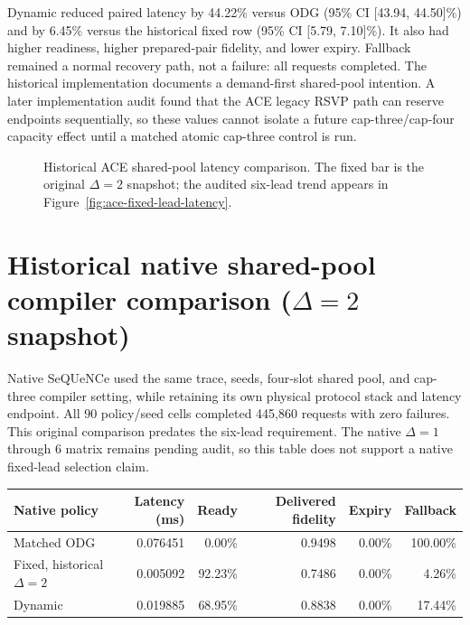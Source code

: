\documentclass[11pt,a4paper]{report}
\begin{document}
Dynamic reduced paired latency by 44.22\% versus ODG (95\% CI
[43.94, 44.50]\%) and by 6.45\% versus the historical fixed row (95\% CI
[5.79, 7.10]\%). It also had higher readiness, higher prepared-pair fidelity,
and lower expiry. Fallback remained a normal recovery path, not a failure: all
requests completed. The historical implementation documents a demand-first
shared-pool intention. A later implementation audit found that the ACE legacy
RSVP path can reserve endpoints sequentially, so these values cannot isolate a
future cap-three/cap-four capacity effect until a matched atomic cap-three
control is run.

\begin{figure}[htbp]
\centering
{}
\caption{Historical ACE shared-pool latency comparison. The fixed bar is the
original $\Delta=2$ snapshot; the audited six-lead trend appears in
Figure~\ref{fig:ace-fixed-lead-latency}.}
\label{fig:historical-ace-shared-latency}
\end{figure}

\section{Historical native shared-pool compiler comparison ($\Delta=2$ snapshot)}
Native SeQUeNCe used the same trace, seeds, four-slot shared pool, and cap-three
compiler setting, while retaining its own physical protocol stack and latency
endpoint. All 90 policy/seed cells completed 445,860 requests with zero
failures. This original comparison predates the six-lead requirement. The
native $\Delta=1$ through $6$ matrix remains pending audit, so this table does
not support a native fixed-lead selection claim.

\begin{center}
\begin{tabular}{lrrrrr}
\toprule
Native policy & Latency (ms) & Ready & Delivered fidelity & Expiry & Fallback \\
\midrule
Matched ODG & 0.076451 & 0.00\% & 0.9498 & 0.00\% & 100.00\% \\
Fixed, historical $\Delta=2$ & 0.005092 & 92.23\% & 0.7486 & 0.00\% & 4.26\% \\
Dynamic & 0.019885 & 68.95\% & 0.8838 & 0.00\% & 17.44\% \\
\bottomrule
\end{tabular}
\end{center}
\end{document}
